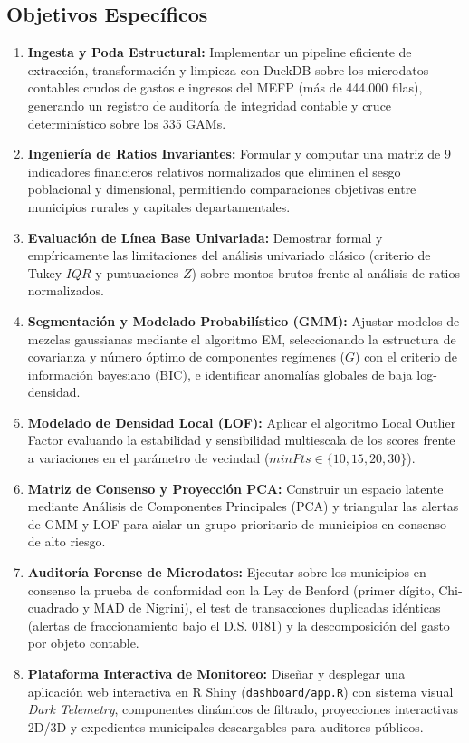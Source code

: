 \documentclass[11pt,a4paper]{article}
\begin{document}
\subsection{Objetivos Específicos}
\begin{enumerate}[label=\textbf{\arabic*.}]
    \item \textbf{Ingesta y Poda Estructural:} Implementar un pipeline eficiente de extracción, transformación y limpieza con DuckDB sobre los microdatos contables crudos de gastos e ingresos del MEFP (más de 444.000 filas), generando un registro de auditoría de integridad contable y cruce determinístico sobre los 335 GAMs.
    \item \textbf{Ingeniería de Ratios Invariantes:} Formular y computar una matriz de 9 indicadores financieros relativos normalizados que eliminen el sesgo poblacional y dimensional, permitiendo comparaciones objetivas entre municipios rurales y capitales departamentales.
    \item \textbf{Evaluación de Línea Base Univariada:} Demostrar formal y empíricamente las limitaciones del análisis univariado clásico (criterio de Tukey $IQR$ y puntuaciones $Z$) sobre montos brutos frente al análisis de ratios normalizados.
    \item \textbf{Segmentación y Modelado Probabilístico (GMM):} Ajustar modelos de mezclas gaussianas mediante el algoritmo EM, seleccionando la estructura de covarianza y número óptimo de componentes regímenes ($G$) con el criterio de información bayesiano (BIC), e identificar anomalías globales de baja log-densidad.
    \item \textbf{Modelado de Densidad Local (LOF):} Aplicar el algoritmo Local Outlier Factor evaluando la estabilidad y sensibilidad multiescala de los scores frente a variaciones en el parámetro de vecindad ($minPts \in \{10, 15, 20, 30\}$).
    \item \textbf{Matriz de Consenso y Proyección PCA:} Construir un espacio latente mediante Análisis de Componentes Principales (PCA) y triangular las alertas de GMM y LOF para aislar un grupo prioritario de municipios en consenso de alto riesgo.
    \item \textbf{Auditoría Forense de Microdatos:} Ejecutar sobre los municipios en consenso la prueba de conformidad con la Ley de Benford (primer dígito, Chi-cuadrado y MAD de Nigrini), el test de transacciones duplicadas idénticas (alertas de fraccionamiento bajo el D.S. 0181) y la descomposición del gasto por objeto contable.
    \item \textbf{Plataforma Interactiva de Monitoreo:} Diseñar y desplegar una aplicación web interactiva en R Shiny (\texttt{dashboard/app.R}) con sistema visual \textit{Dark Telemetry}, componentes dinámicos de filtrado, proyecciones interactivas 2D/3D y expedientes municipales descargables para auditores públicos.
\end{enumerate}
\end{document}

